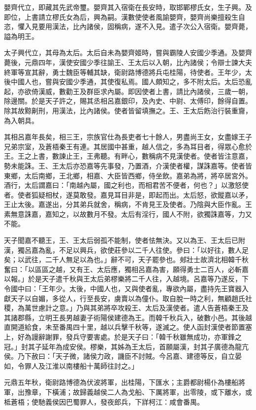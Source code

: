\begin{pinyinscope}
嬰齊代立，即藏其先武帝璽。嬰齊其入宿衛在長安時，取邯鄲樛氏女，生子興。及即位，上書請立樛氏女為后，興為嗣。漢數使使者風諭嬰齊，嬰齊尚樂擅殺生自恣，懼入見要用漢法，比內諸侯，固稱病，遂不入見。遣子次公入宿衛。嬰齊薨，謚為明王。

太子興代立，其母為太后。太后自未為嬰齊姬時，嘗與霸陵人安國少季通。及嬰齊薨後，元鼎四年，漢使安國少季往諭王、王太后以入朝，比內諸侯；令辯士諫大夫終軍等宣其辭，勇士魏臣等輔其缺，衛尉路博德將兵屯桂陽，待使者。王年少，太後中國人也，嘗與安國少季通，其使復私焉。國人頗知之，多不附太后。太后恐亂起，亦欲倚漢威，數勸王及群臣求內屬。即因使者上書，請比內諸侯，三歲一朝，除邊關。於是天子許之，賜其丞相呂嘉銀印，及內史、中尉、太傅印，餘得自置。除其故黥劓刑，用漢法，比內諸侯。使者皆留填撫之。王、王太后飭治行裝重齎，為入朝具。

其相呂嘉年長矣，相三王，宗族官仕為長吏者七十餘人，男盡尚王女，女盡嫁王子兄弟宗室，及蒼梧秦王有連。其居國中甚重，越人信之，多為耳目者，得眾心愈於王。王之上書，數諫止王，王弗聽。有畔心，數稱病不見漢使者。使者皆注意嘉，勢未能誅。王、王太后亦恐嘉等先事發，乃置酒，介漢使者權，謀誅嘉等。使者皆東鄉，太后南鄉，王北鄉，相嘉、大臣皆西鄉，侍坐飲。嘉弟為將，將卒居宮外。酒行，太后謂嘉曰：「南越內屬，國之利也，而相君苦不便者，何也？」以激怒使者。使者狐疑相杖，遂莫敢發。嘉見耳目非是，即起而出。太后怒，欲鏦嘉以矛，王止太後。嘉遂出，分其弟兵就舍，稱病，不肯見王及使者。乃陰與大臣作亂。王素無意誅嘉，嘉知之，以故數月不發。太后有淫行，國人不附，欲獨誅嘉等，力又不能。

天子聞嘉不聽王，王、王太后弱孤不能制，使者怯無決。又以為王、王太后已附漢，獨呂嘉為亂，不足以興兵，欲使莊參以二千人往使。參曰：「以好往，數人足矣；以武往，二千人無足以為也。」辭不可，天子罷參也。郟壯士故濟北相韓千秋奮曰：「以區區之越，又有王、太后應，獨相呂嘉為害，願得勇士二百人，必斬嘉以報。」於是天子遣千秋與王太后弟樛樂將二千人往，入越境。呂嘉等乃遂反，下令國中曰：「王年少。太後，中國人也，又與使者亂，專欲內屬，盡持先王寶器入獻天子以自媚，多從人，行至長安，虜賣以為僮仆。取自脫一時之利，無顧趙氏社稷，為萬世慮計之意。」乃與其弟將卒攻殺王、太后及漢使者。遣人告蒼梧秦王及其諸郡縣，立明王長男越妻子術陽侯建德為王。而韓千秋兵入，破數小邑。其後越直開道給食，未至番禺四十里，越以兵擊千秋等，遂滅之。使人函封漢使者節置塞上，好為謾辭謝罪，發兵守要害處。於是天子曰：「韓千秋雖無成功，亦軍鋒之冠。」封其子延年為成安侯。樛樂，其姊為王太后，首願屬漢，封其子廣德為龍亢侯。乃下赦曰：「天子微，諸侯力政，譏臣不討賊。今呂嘉、建德等反，自立晏如，令罪人及江淮以南樓船十萬師往討之。」

元鼎五年秋，衛尉路博德為伏波將軍，出桂陽，下匯水；主爵都尉楊仆為樓船將軍，出豫章，下橫浦；故歸義越侯二人為戈船、下厲將軍，出零陵，或下離水，或柢蒼梧；使馳義侯因巴蜀罪人，發夜郎兵，下牂柯江：咸會番禺。


\end{pinyinscope}
